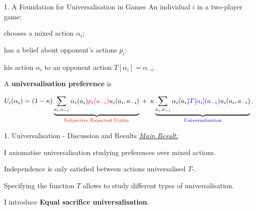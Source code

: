 \documentclass[usenames,dvipsnames,aspectratio=169,11pt]{beamer}
\begin{document}
\begin{frame}[noframenumbering]{1. A Foundation for Universalisation in Games}
	An individual \( i \) in a two-player game:

	\vfill

	\begin{wideitemize}
		\item chooses a mixed action \( \alpha_i \);
		\item has a belief about opponent's actions \( p_i \);
		\item {} his action \( \alpha_i \) to an opponent action \( T [\alpha_{i} ] = \alpha_{-i} \).
	\end{wideitemize}

	\vfill

	A \textbf{universalisation preference} is

	\vfill

	\[
		\begin{aligned}
			U_i(\alpha_i) = (1-\kappa) \underbrace{\sum_{a_i, a_{-i}} \alpha_i(a_i) \textcolor{red}{p_{i}(a_{-i})} u_i(a_i, a_{-i})}_{\text{\textcolor{red}{Subjective Expected Utility}}} \: + \: \: \kappa \underbrace{\sum_{a_i, a_{-i}} \alpha_i(a_i) \textcolor{blue}{T [ \alpha_i ](a_{-i})} u_i(a_i, a_{-i})}_{\text{\textcolor{blue}{Universalisation}}} .
		\end{aligned}
	\]

\end{frame}

\begin{frame}{1. Universalisation - Discussion and Results}
	\underline{\textit{Main Result:}}

	I axiomatise universalisation studying preferences over mixed actions. \pause

	\vfill

	Independence is only satisfied between actions universalised \( T \)-. \pause

	\vfill

	Specifying the function \( T \) allows to study different types of universalisation. \pause

	\vfill

	I introduce \textbf{Equal sacrifice universalisation}.

\end{frame}
\end{document}
